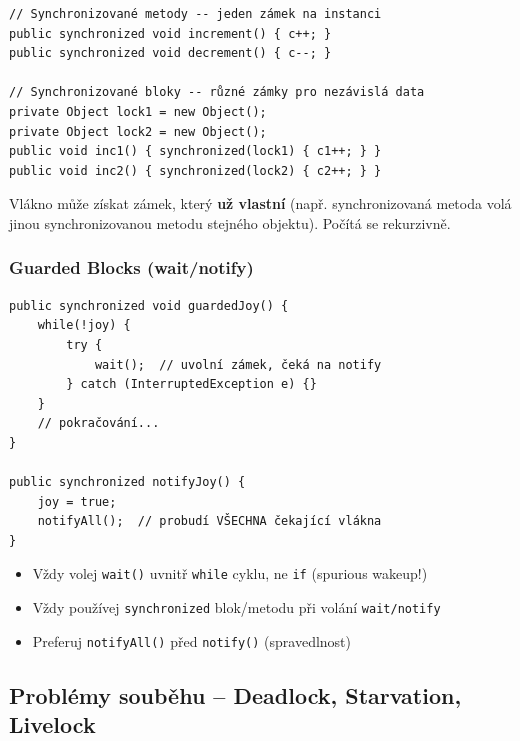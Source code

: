\documentclass[11pt,a4paper]{article}
\begin{document}
\begin{verbatim}
// Synchronizované metody -- jeden zámek na instanci
public synchronized void increment() { c++; }
public synchronized void decrement() { c--; }

// Synchronizované bloky -- různé zámky pro nezávislá data
private Object lock1 = new Object();
private Object lock2 = new Object();
public void inc1() { synchronized(lock1) { c1++; } }
public void inc2() { synchronized(lock2) { c2++; } }
\end{verbatim}

\begin{tcolorbox}[tipbox,title=Reentrant synchronizace]
Vlákno může získat zámek, který \textbf{už vlastní} (např. synchronizovaná metoda volá jinou synchronizovanou metodu stejného objektu). Počítá se rekurzivně.
\end{tcolorbox}

\subsubsection{Guarded Blocks (wait/notify)}

\begin{verbatim}
public synchronized void guardedJoy() {
    while(!joy) {
        try {
            wait();  // uvolní zámek, čeká na notify
        } catch (InterruptedException e) {}
    }
    // pokračování...
}

public synchronized notifyJoy() {
    joy = true;
    notifyAll();  // probudí VŠECHNA čekající vlákna
}
\end{verbatim}

\begin{tcolorbox}[warnbox,title=Pravidla pro wait/notify]
\begin{itemize}
    \item Vždy volej \texttt{wait()} uvnitř \texttt{while} cyklu, ne \texttt{if} (spurious wakeup!)
    \item Vždy používej \texttt{synchronized} blok/metodu při volání \texttt{wait/notify}
    \item Preferuj \texttt{notifyAll()} před \texttt{notify()} (spravedlnost)
\end{itemize}
\end{tcolorbox}

\subsection{Problémy souběhu -- Deadlock, Starvation, Livelock}
\end{document}
